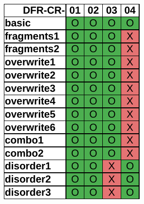 \begin{figure}
\begin{subfigure}{0.3\linewidth}
        \includegraphics[width=\linewidth]{fig/axiom_results_fat.pdf}
    \end{subfigure}~~
    \begin{subfigure}{0.3\linewidth}

\end{subfigure}
\end{figure}
